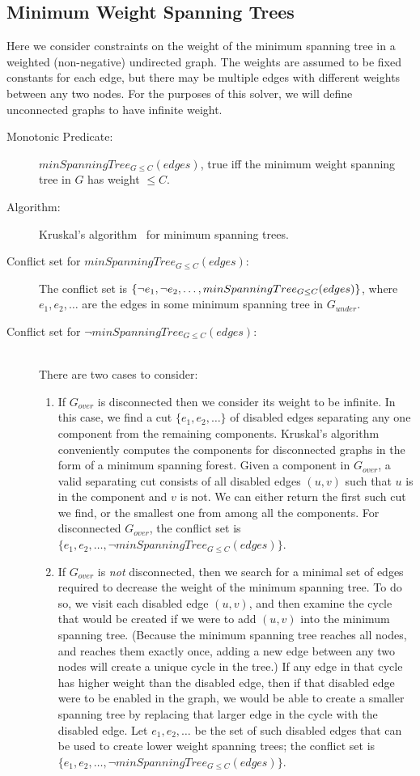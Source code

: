 \documentclass[runningheads]{llncs}
\newcommand{\gunder}{G_{under}}
\newcommand{\gover}{G_{over}}
\begin{document}
\subsection{{Minimum Weight Spanning Trees}}
Here we consider constraints on the weight of the minimum spanning tree in a weighted (non-negative) undirected graph. The weights are assumed to be fixed constants for each edge, but there may be multiple edges with different weights between any two nodes. For the purposes of this solver, we will define unconnected graphs to have infinite weight. 
\begin{description}
\item[Monotonic Predicate:] $minSpanningTree_{G\leq C}(edges)$, true iff the minimum weight spanning tree in $G$ has weight $\leq C$.
\item[Algorithm:] Kruskal's algorithm~\cite{kruskal1956shortest} for minimum spanning trees.
\item[Conflict set for $minSpanningTree_{G\leq C}(edges)$:] The conflict set is $\{\lnot e_1, \lnot e_2,  \ldots,\\ minSpanningTree_{G\leq C}(edges)\}$, where $e_1, e_2, \ldots$ are the edges in some minimum spanning tree in $\gunder$.
\item[Conflict set for $\lnot minSpanningTree_{G\leq C}(edges)$:]~\\There are two cases to consider:
\begin{enumerate}
\item If $\gover$ is disconnected then we consider its weight to be infinite. In this case, we find a  cut $\{e_1, e_2,\ldots\}$ of disabled edges separating any one component from the remaining components. Kruskal's algorithm conveniently computes the components for disconnected graphs in the form of a minimum spanning forest. Given a component in $\gover$, a valid separating cut consists of all disabled edges $(u,v)$ such that $u$ is in the component and $v$ is not. We can either return the first such cut we find, or the smallest one from among all the components. For disconnected $\gover$, the conflict set is  $\{e_1, e_2, \ldots, \lnot minSpanningTree_{G\leq C}(edges)\}$.


\item If $\gover$ is \textit{not} disconnected, then we search for a minimal set of edges required to decrease the weight of the minimum spanning tree. To do so, we visit each disabled edge $(u,v)$, and then examine the cycle that would be created if we were to add $(u,v)$ into the minimum spanning tree. (Because the minimum spanning tree reaches all nodes, and reaches them exactly once, adding a new edge between any two nodes will create a unique cycle in the tree.) If any edge in that cycle has higher weight than the disabled edge, then if that disabled edge were to be enabled in the graph, we would be able to create a smaller spanning tree by replacing that larger edge in the cycle with the disabled edge. Let $e_1, e_2, \ldots$ be the set of such disabled edges that can be used to create lower weight spanning trees; the conflict set is $\{e_1, e_2, \ldots, \lnot minSpanningTree_{G\leq C}(edges)\}$.



\end{enumerate}
\end{description}
\end{document}
